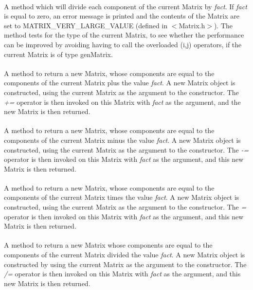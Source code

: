  \\
A method which will divide each component of the current Matrix
by {\em fact}. If {\em fact} is equal to zero, an error message is
printed and the contents of the Matrix are set to
MATRIX\_VERY\_LARGE\_VALUE (defined in $<$Matrix.h$>$). The method
tests for the type of the current Matrix, to see whether the
performance can be improved by avoiding having to call the overloaded
(i,j) operators, if the current Matrix is of type genMatrix. \\ 

 \\
A method to return a new Matrix, whose components are equal to the
components of the current Matrix plus the value {\em fact}. A new
Matrix object is constructed, using the current Matrix as the
argument to the constructor. The {\em +=} operator is then invoked 
on this Matrix with {\em fact} as the argument, and the new Matrix is
then returned. \\ 

 \\
A method to return a new Matrix, whose components are equal to the
components of the current Matrix minus the value {\em fact}. A new
Matrix object is constructed, using the current Matrix as the
argument to the constructor. The {\em -=} operator is then invoked 
on this Matrix with {\em fact} as the argument, and this new Matrix is
then returned. \\ 


 \\
A method to return a new Matrix, whose components are equal to the
components of the current Matrix times the value {\em fact}. A new
Matrix object is constructed, using the current Matrix as the
argument to the constructor. The {\em *=} operator is then invoked 
on this Matrix with {\em fact} as the argument, and this new Matrix is
then returned. \\ 

 \\
A method to return a new Matrix whose components are equal to the
components of the current Matrix divided the value {\em fact}. A new
Matrix object is constructed by using the current Matrix as the
argument to the constructor. The {\em /=} operator is then invoked 
on this Matrix with {\em fact} as the argument, and this new Matrix is
then returned. \\ 

